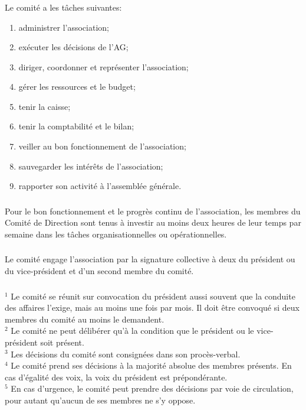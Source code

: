\documentclass[12pt,a4paper,oneside]{article}
\newcounter{art}
\newcommand{\french}{    \switchcolumn[1]\noindent}
\newcounter{para}
\begin{document}
\begin{paracol}{2}
\french
	\subsubsection{}
	Le comité a les tâches suivantes:
	\begin{enumerate}[-]
		\item administrer l’association;
		\item exécuter les décisions de l’AG;
		\item diriger, coordonner et représenter l’association;
		\item gérer les ressources et le budget;
		\item tenir la caisse;
		\item tenir la comptabilité et le bilan;
		\item veiller au bon fonctionnement de l’association;
		\item sauvegarder les intérêts de l’association;
		\item rapporter son activité à l’assemblée générale.
	\end{enumerate}

\french
	\subsubsection{}
	Pour le bon fonctionnement et le progrès continu de l'association, les membres du Comité de Direction sont tenus à investir au moins deux heures de leur temps par semaine dans les tâches organisationnelles ou opérationnelles. 


\french
	\subsubsection{}
	Le comité engage l’association par la signature collective à deux du président ou du vice-président et d’un second membre du comité. 

\french
	\subsubsection{}
	$^1$ Le comité se réunit sur convocation du président aussi souvent que la conduite des affaires l’exige, mais au moins une fois par mois. Il doit être convoqué si deux membres du comité au moins le demandent. \\
	$^2$ Le comité ne peut délibérer qu’à la condition que le président ou le vice-président soit présent.\\
	$^3$ Les décisions du comité sont consignées dans son procès-verbal.\\
	$^4$ Le comité prend ses décisions à la majorité absolue des membres présents. En cas d’égalité des voix, la voix du président est prépondérante.\\
	$^5$ En cas d’urgence, le comité peut prendre des décisions par voie de circulation, pour autant qu’aucun de ses membres ne s’y oppose.



\end{paracol}
\end{document}

